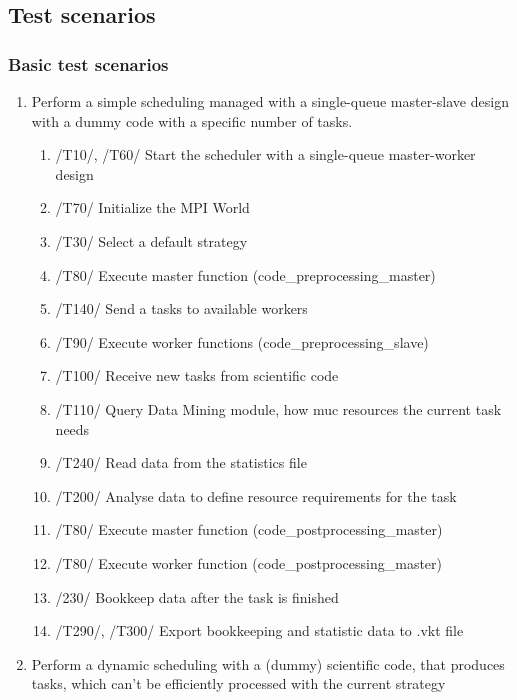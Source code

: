 {\begin{itemize}
		\end{itemize}				
		
		
		\subsection{Test scenarios}
		
		\subsubsection{Basic test scenarios}
		
		\begin{enumerate}
			\item Perform a simple scheduling managed with a single-queue master-slave design with a dummy code with a specific number of tasks.
			\begin{enumerate}
				\item /T10/, /T60/ Start the scheduler with a single-queue master-worker design
				\item /T70/ Initialize the MPI World
				\item /T30/ Select a default strategy
				\item /T80/ Execute master function (code\_preprocessing\_master)
				\item /T140/ Send a tasks to available workers
				\item /T90/ Execute worker functions (code\_preprocessing\_slave)
				\item /T100/ Receive new tasks from scientific code
				\item /T110/ Query Data Mining module, how muc resources the current task needs
				\item /T240/ Read data from the statistics file
				\item /T200/ Analyse data to define resource requirements for the task
				\item /T80/ Execute master function (code\_postprocessing\_master)
				\item /T80/ Execute worker function (code\_postprocessing\_master)
				\item /230/ Bookkeep data after the task is finished
				\item /T290/, /T300/ Export bookkeeping and statistic data to .vkt file
			\end{enumerate}
			
			
			
			\item Perform a dynamic scheduling with a (dummy) scientific code, that produces tasks, which can't be efficiently processed with the current strategy 
				

\end{enumerate}}
